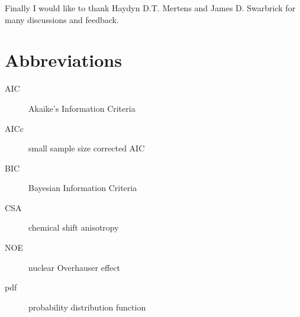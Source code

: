 \documentclass[a4paper, 11pt, twoside, openright]{book}
\newenvironment{spacedpara}{\setlength{\parindent}{0pt} \setlength{\parskip}{2ex plus 0.5ex minus 0.2ex}}{}
\begin{document}
Finally I would like to thank Haydyn D.T. Mertens and James D. Swarbrick for many discussions and feedback.




\tableofcontents



\listoffigures






\chapter*{Abbreviations}

\begin{description}

\item[AIC]  Akaike's Information Criteria
\item[AICc]  small sample size corrected AIC
\item[BIC]  Bayesian Information Criteria
\item[CSA]  chemical shift anisotropy
\item[NOE]  nuclear Overhauser effect
\item[pdf]  probability distribution function

\end{description}




\mainmatter
\begin{spacedpara}





















\end{spacedpara}










\printindex
\end{document}
